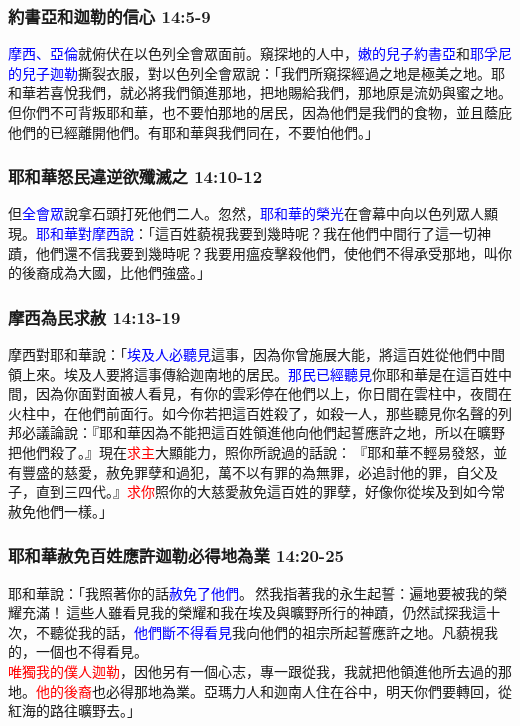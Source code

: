 \subsubsection{約書亞和迦勒的信心 14:5-9}
\textcolor{blue}{摩西、亞倫}就俯伏在以色列全會眾面前。窺探地的人中，\textcolor{blue}{嫩的兒子約書亞}和\textcolor{blue}{耶孚尼的兒子迦勒}撕裂衣服，對以色列全會眾說：「我們所窺探經過之地是極美之地。耶和華若喜悅我們，就必將我們領進那地，把地賜給我們，那地原是流奶與蜜之地。但你們不可背叛耶和華，也不要怕那地的居民，因為他們是我們的食物，並且蔭庇他們的已經離開他們。有耶和華與我們同在，不要怕他們。」

\subsubsection{耶和華怒民違逆欲殲滅之 14:10-12}
但\textcolor{blue}{全會眾}說拿石頭打死他們二人。忽然，\textcolor{blue}{耶和華的榮光}在會幕中向以色列眾人顯現。\textcolor{blue}{耶和華對摩西說}：「這百姓藐視我要到幾時呢？我在他們中間行了這一切神蹟，他們還不信我要到幾時呢？我要用瘟疫擊殺他們，使他們不得承受那地，叫你的後裔成為大國，比他們強盛。」

\subsubsection{摩西為民求赦 14:13-19}
摩西對耶和華說：「\textcolor{blue}{埃及人必聽見}這事，因為你曾施展大能，將這百姓從他們中間領上來。埃及人要將這事傳給迦南地的居民。\textcolor{blue}{那民已經聽見}你耶和華是在這百姓中間，因為你面對面被人看見，有你的雲彩停在他們以上，你日間在雲柱中，夜間在火柱中，在他們前面行。如今你若把這百姓殺了，如殺一人，那些聽見你名聲的列邦必議論說：『耶和華因為不能把這百姓領進他向他們起誓應許之地，所以在曠野把他們殺了。』現在\textcolor{red}{求主}大顯能力，照你所說過的話說： 『耶和華不輕易發怒，並有豐盛的慈愛，赦免罪孽和過犯，萬不以有罪的為無罪，必追討他的罪，自父及子，直到三四代。』\textcolor{red}{求你}照你的大慈愛赦免這百姓的罪孽，好像你從埃及到如今常赦免他們一樣。」

\subsubsection{耶和華赦免百姓應許迦勒必得地為業 14:20-25}
耶和華說：「我照著你的話\textcolor{blue}{赦免了他們}。 然我指著我的永生起誓：遍地要被我的榮耀充滿！ 這些人雖看見我的榮耀和我在埃及與曠野所行的神蹟，仍然試探我這十次，不聽從我的話，\textcolor{blue}{他們斷不得看見}我向他們的祖宗所起誓應許之地。凡藐視我的，一個也不得看見。\\
\textcolor{red}{唯獨我的僕人迦勒}，因他另有一個心志，專一跟從我，我就把他領進他所去過的那地。\textcolor{red}{他的後裔}也必得那地為業。亞瑪力人和迦南人住在谷中，明天你們要轉回，從紅海的路往曠野去。」

